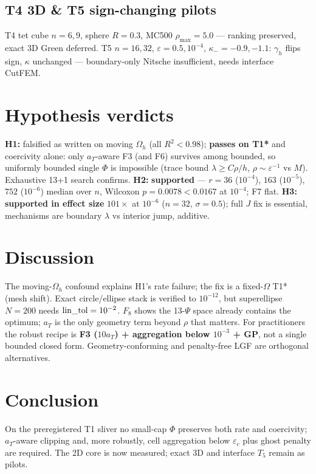\documentclass[11pt]{article}
\theoremstyle{definition}
\begin{document}
\subsection{T4 3D \& T5 sign-changing pilots}
T4 tet cube $n=6,9$, sphere $R=0.3$, MC500 $\rho_{\max}=5.0$ — ranking preserved,
exact 3D Green deferred. T5 $n=16,32$, $\varepsilon=0.5,10^{-4}$,
$\kappa_-=-0.9,-1.1$: $\gamma_h$ flips sign, $\kappa$ unchanged — boundary-only
Nitsche insufficient, needs interface CutFEM.

\section{Hypothesis verdicts}
\textbf{H1:} falsified as written on moving $\Omega_h$ (all $R^2<0.98$);
\textbf{passes on T1*} and coercivity alone: only $a_T$-aware F3 (and F6)
survives among bounded, so uniformly bounded single $\Phi$ is impossible
(trace bound $\lambda\ge C\rho/h$, $\rho\sim\varepsilon^{-1}$ vs $M$).
Exhaustive 13+1 search confirms.
\textbf{H2:} \textbf{supported} — $r=36$ ($10^{-4}$), $163$ ($10^{-5}$),
$752$ ($10^{-6}$) median over $n$, Wilcoxon $p=0.0078<0.0167$ at $10^{-4}$; F7 flat.
\textbf{H3:} \textbf{supported in effect size} $101\times$ at $10^{-6}$
($n=32$, $\sigma=0.5$); full $J$ fix is essential, mechanisms are
boundary $\lambda$ vs interior jump, additive.

\section{Discussion}
The moving-$\Omega_h$ confound explains H1's rate failure; the fix is a
fixed-$\Omega$ T1* (mesh shift). Exact circle/ellipse stack is verified to
$10^{-12}$, but superellipse $N=200$ needs ${\rm lin\_tol}=10^{-2}$.
$F_8$ shows the 13-$\Psi$ space already contains the optimum; $a_T$ is the
only geometry term beyond $\rho$ that matters. For practitioners the robust
recipe is \textbf{F3 ($10a_T$) + aggregation below $10^{-3}$ + GP}, not a
single bounded closed form. Geometry-conforming \citep{lin2026geometry} and
penalty-free LGF \citep{xia2026penaltyfree} are orthogonal alternatives.

\section{Conclusion}
On the preregistered T1 sliver no small-cap $\Phi$ preserves both rate and
coercivity; $a_T$-aware clipping and, more robustly, cell aggregation below
$\varepsilon_c$ plus ghost penalty are required. The 2D core is now measured;
exact 3D and interface $T_5$ remain as pilots.
\end{document}
